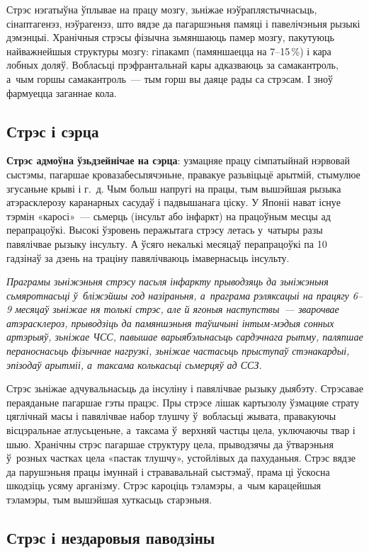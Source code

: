 Стрэс нэгатыўна ўплывае на працу мозгу, зьніжае нэўраплястычнасьць, сінаптагенэз, нэўрагенэз, што вядзе да пагаршэньня памяці і павелічэньня рызыкі дэмэнцыі. Хранічныя стрэсы фізычна зьмяншаюць памер мозгу, пакутуюць найважнейшыя структуры мозгу: гіпакамп (памяншаецца на 7--15\,\%) і кара лобных доляў. Вобласьці прэфрантальнай кары адказваюць за самакантроль, а~чым горшы самакантроль~--- тым горш вы даяце рады са стрэсам. І зноў фармуецца заганнае кола.

\subsection*{Стрэс і сэрца}

\textbf{Стрэс адмоўна ўзьдзейнічае на сэрца}: узмацняе працу сімпатыйнай нэрвовай сыстэмы, пагаршае кровазабесьпячэньне, правакуе разьвіцьцё арытмій, стымулюе згусаньне крыві і г.~д. Чым больш напругі на працы, тым вышэйшая рызыка атэрасклерозу каранарных сасудаў і падвышанага ціску. У Японіі нават існуе тэрмін «каросі»~--- сьмерць (інсульт або інфаркт) на працоўным месцы ад перапрацоўкі. Высокі ўзровень перажытага стрэсу летась у~чатыры разы павялічвае рызыку інсульту. А ўсяго некалькі месяцаў перапрацоўкі па 10 гадзінаў за дзень на траціну павялічваюць імавернасьць інсульту.

\emph{Праграмы зьніжэньня стрэсу пасьля інфаркту прыводзяць да зьніжэньня сьмяротнасьці ў~бліжэйшы год назіраньня, а~праграма рэляксацыі на працягу 6--9 месяцаў зьніжае ня толькі стрэс, але й ягоныя наступствы~--- зварочвае атэрасклероз, прыводзіць да памяншэньня таўшчыні інтым-мэдыя сонных артэрыяў, зьніжае ЧСС, павышае варыябэльнасьць сардэчнага рытму, паляпшае пераноснасьць фізычнае нагрузкі, зьніжае частасьць прыступаў стэнакардыі, эпізодаў арытміі, а~таксама колькасьці сьмерцяў ад ССЗ.}

Стрэс зьніжае адчувальнасьць да інсуліну і павялічвае рызыку дыябэту. Стрэсавае пераяданьне пагаршае гэты працэс. Пры стрэсе лішак картызолу ўзмацняе страту цяглічнай масы і павялічвае набор тлушчу ў~вобласьці жывата, правакуючы вісцэральнае атлусьценьне, а~таксама ў~верхняй частцы цела, уключаючы твар і шыю. Хранічны стрэс пагаршае структуру цела, прыводзячы да ўтварэньня ў~розных частках цела «пастак тлушчу», устойлівых да пахуданьня. Стрэс вядзе да парушэньня працы імуннай і стрававальнай сыстэмаў, прама ці ўскосна шкодзіць усяму арганізму. Стрэс кароціць тэламэры, а~чым карацейшыя тэламэры, тым вышэйшая хуткасьць старэньня.

\subsection*{Стрэс і нездаровыя паводзіны}


